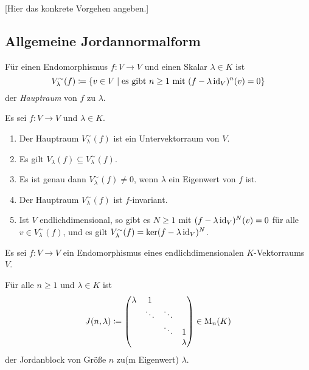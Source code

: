 [Hier das konkrete Vorgehen angeben.]










\subsection{Allgemeine Jordannormalform}


\begin{definition}
  Für einen Endomorphismus $f \colon V \to V$ und einen Skalar $\lambda \in K$ ist
  \[
    V^\sim_\lambda(f)
    \coloneqq
    \{
      v \in V
      \mid
      \text{es gibt $n \geq 1$ mit $(f - \lambda \operatorname{id}_V)^n(v) = 0$}
    \}
  \]
  der \emph{Hauptraum} von $f$ zu $\lambda$.
\end{definition}


\begin{lemma}
  Es sei $f \colon V \to V$ und $\lambda \in K$.
  \begin{enumerate}[leftmargin=*, label=\roman*)]
    \item
      Der Hauptraum $V^\sim_\lambda(f)$ ist ein Untervektorraum von $V$.
    \item
      Es gilt $V_\lambda(f) \subseteq V^\sim_\lambda(f)$.
    \item
      Es ist genau dann $V^\sim_\lambda(f) \neq 0$, wenn $\lambda$ ein Eigenwert von $f$ ist.
    \item
      Der Hauptraum $V^\sim_\lambda(f)$ ist $f$-invariant.
    \item
      Ist $V$ endlichdimensional, so gibt es $N \geq 1$ mit $(f - \lambda \operatorname{id}_V)^N(v) = 0$ für alle $v \in V^\sim_\lambda(f)$, und es gilt $V^\sim_\lambda(f) = \ker (f - \lambda \operatorname{id}_V)^N$.
  \end{enumerate}
\end{lemma}


\begin{lemma}
  Es sei $f \colon V \to V$ ein Endomorphismus eines endlichdimensionalen $K$-Vek\-tor\-raums $V$.
\end{lemma}


\begin{notation}
  Für alle $n \geq 1$ und $\lambda \in K$ ist
  \[
    J(n, \lambda)
    \coloneqq
    \begin{pmatrix}
      \lambda & 1       &         &         \\
              & \ddots  & \ddots  &         \\
              &         & \ddots  & 1       \\
              &         &         & \lambda
    \end{pmatrix}
    \in \mathrm{M}_n(K)
  \]
  der Jordanblock von Größe $n$ zu(m Eigenwert) $\lambda$.
\end{notation}


